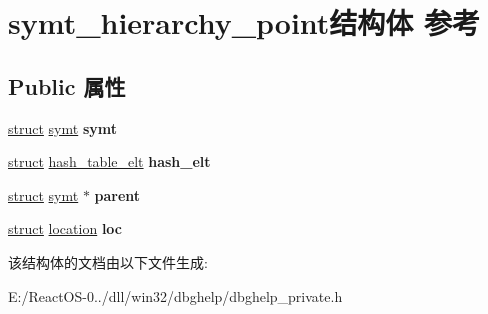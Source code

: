 \hypertarget{structsymt__hierarchy__point}{}\section{symt\+\_\+hierarchy\+\_\+point结构体 参考}
\label{structsymt__hierarchy__point}
\subsection*{Public 属性}
\begin{DoxyCompactItemize}
\item 
\mbox{\label{structsymt__hierarchy__point_ab6a0e3f0a6e7218136500de7626d3e97}} 
\hyperlink{interfacestruct}{struct} \hyperlink{structsymt}{symt} {\bfseries symt}
\item 
\mbox{\label{structsymt__hierarchy__point_ae2ff7dfee78651ec72391e9f785b2e22}} 
\hyperlink{interfacestruct}{struct} \hyperlink{structhash__table__elt}{hash\+\_\+table\+\_\+elt} {\bfseries hash\+\_\+elt}
\item 
\mbox{\label{structsymt__hierarchy__point_ada3a590a2a6a8fbfe64ea8214c8fb2cc}} 
\hyperlink{interfacestruct}{struct} \hyperlink{structsymt}{symt} $\ast$ {\bfseries parent}
\item 
\mbox{\label{structsymt__hierarchy__point_a23d1be060a7d85b0bbeb648714dd706c}} 
\hyperlink{interfacestruct}{struct} \hyperlink{structlocation}{location} {\bfseries loc}
\end{DoxyCompactItemize}


该结构体的文档由以下文件生成\+:\begin{DoxyCompactItemize}
\item 
E\+:/\+React\+O\+S-\/0../dll/win32/dbghelp/dbghelp\+\_\+private.\+h\end{DoxyCompactItemize}
